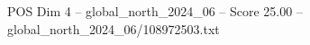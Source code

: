 \begin{textsample}{POS Dim 4 – global\_north\_2024\_06 – Score 25.00 – global\_north\_2024\_06/108972503.txt}
\end{textsample}
